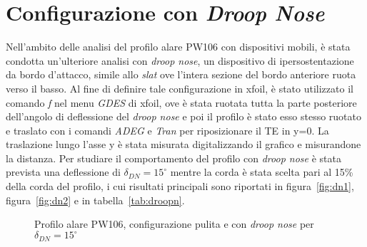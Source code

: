 \newpage
\section {Configurazione con {\itshape Droop Nose}}
Nell'ambito delle analisi del profilo alare PW106 con dispositivi mobili, è stata condotta un'ulteriore analisi con {\itshape droop nose}, un dispositivo di ipersostentazione da bordo d'attacco, simile allo {\itshape slat} ove l'intera sezione del bordo anteriore ruota verso il basso. Al fine di definire tale configurazione in xfoil, è stato utilizzato il comando {\itshape f} nel menu {\itshape GDES} di xfoil, ove è stata ruotata tutta la parte posteriore dell'angolo di deflessione del {\itshape droop nose} e poi il profilo è stato esso stesso ruotato e traslato con i comandi {\itshape ADEG} e {\itshape Tran} per riposizionare il TE in y=0. La traslazione lungo l'asse y è stata misurata digitalizzando il grafico e misurandone la distanza.
Per studiare il comportamento del profilo con {\itshape droop nose} è stata prevista una deflessione di  $\delta_{DN} = 15^\circ $ mentre la corda è stata scelta pari al 15\% della corda del profilo, i cui risultati principali sono riportati in  figura~\vref{fig:dn1},  figura~\vref{fig:dn2} e in  tabella~\vref{tab:droopn}.\\

\begin{figure} [H]
\centering
{}
\caption{\footnotesize Profilo alare PW106, configurazione pulita e con {\itshape droop nose} per $\delta_{DN} = 15^\circ $}
\end{figure}


